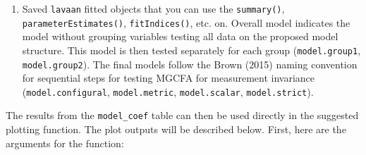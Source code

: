 \documentclass[
  man]{apa6}
\providecommand{\tightlist}{%
  \setlength{\itemsep}{0pt}\setlength{\parskip}{0pt}}
\begin{document}
\begin{enumerate}
\def\labelenumi{\arabic{enumi})}
\setcounter{enumi}{2}
\tightlist
\item
  Saved \texttt{lavaan} fitted objects that you can use the \texttt{summary()}, \texttt{parameterEstimates()}, \texttt{fitIndices()}, etc. on. Overall model indicates the model without grouping variables testing all data on the proposed model structure. This model is then tested separately for each group (\texttt{model.group1}, \texttt{model.group2}). The final models follow the Brown (2015) naming convention for sequential steps for testing MGCFA for measurement invariance (\texttt{model.configural}, \texttt{model.metric}, \texttt{model.scalar}, \texttt{model.strict}).
\end{enumerate}

The results from the \texttt{model\_coef} table can then be used directly in the suggested plotting function. The plot outputs will be described below. First, here are the arguments for the function:
\end{document}
